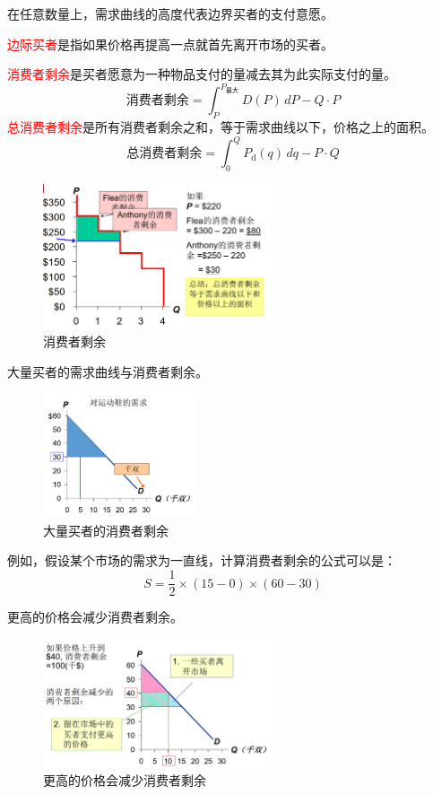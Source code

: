 \documentclass[12pt, a4paper]{article}
\begin{document}
在任意数量上，需求曲线的高度代表边界买者的支付意愿。

\textcolor{red}{边际买者}是指如果价格再提高一点就首先离开市场的买者。

\textcolor{red}{消费者剩余}是买者愿意为一种物品支付的量减去其为此实际支付的量。
\[
\text{消费者剩余} = \int_{P}^{P_{\text{最大}}} D(P) \, dP - Q \cdot P
\]
\textcolor{red}{总消费者剩余}是所有消费者剩余之和，等于需求曲线以下，价格之上的面积。
\[
\text{总消费者剩余} = \int_{0}^{Q} P_{\text{d}}(q) \, dq - P \cdot Q
\]

\begin{figure}[H]
  \centering
  \includegraphics[width=0.6\textwidth]{消费者剩余.png}
  \caption{消费者剩余}
\end{figure}

大量买者的需求曲线与消费者剩余。

\begin{figure}[H]
  \centering
  \includegraphics[width=0.4\textwidth]{大量买者的消费者剩余.png}
  \caption{大量买者的消费者剩余}
\end{figure}

例如，假设某个市场的需求为一直线，计算消费者剩余的公式可以是：
\[
S = \frac{1}{2} \times (15 - 0) \times (60 - 30)
\]

更高的价格会减少消费者剩余。

\begin{figure}[H]
  \centering
  \includegraphics[width=0.6\textwidth]{更高的价格会减少消费者剩余.png}
  \caption{更高的价格会减少消费者剩余}
\end{figure}
\end{document}
